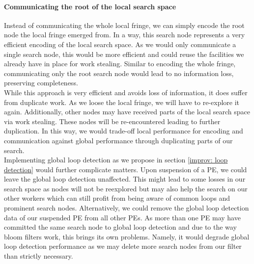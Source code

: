 \paragraph{Communicating the root of the local search space}
Instead of communicating the whole local fringe, we can simply encode the root node the local fringe emerged from. In a way, this search node represents a very efficient encoding of the local search space. As we would only communicate a single search node, this would be more efficient and could reuse the facilities we already have in place for work stealing. Similar to encoding the whole fringe, communicating only the root search node would lead to no information loss, preserving completeness. \\
While this approach is very efficient and avoids loss of information, it does suffer from duplicate work. As we loose the local fringe, we will have to re-explore it again. Additionally, other nodes may have received parts of the local search space via work stealing. These nodes will be re-encountered leading to further duplication. In this way, we would trade-off local performance for encoding and communication against global performance through duplicating parts of our search. \\
Implementing global loop detection as we propose in section \ref{improv: loop detection} would further complicate matters. Upon suspension of a PE, we could leave the global loop detection unaffected. This might lead to some losses in our search space as nodes will not be reexplored but may also help the search on our other workers which can still profit from being aware of common loops and prominent search nodes. Alternatively, we could remove the global loop detection data of our suspended PE from all other PEs. As more than one PE may have committed the same search node to global loop detection and due to the way bloom filters work, this brings its own problems. Namely, it would degrade global loop detection performance as we may delete more search nodes from our filter than strictly necessary.
\begin{comment}
- easy and cheap
- duplication of work
- re-exploring things
- nodes that were sent off to other PEs
- how to deal with global loop detection
- delete everything, too conservative, less performance
- do not delete, cut off things wrongly
- restarts deal with this increased false positive rate
\end{comment}


